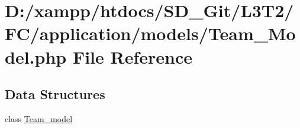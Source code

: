 \hypertarget{application_2models_2_team___model_8php}{}\section{D\+:/xampp/htdocs/\+S\+D\+\_\+\+Git/\+L3\+T2/\+F\+C/application/models/\+Team\+\_\+\+Model.php File Reference}
\label{application_2models_2_team___model_8php}
\subsection*{Data Structures}
\begin{DoxyCompactItemize}
\item 
class \hyperlink{class_team__model}{Team\+\_\+model}
\end{DoxyCompactItemize}
